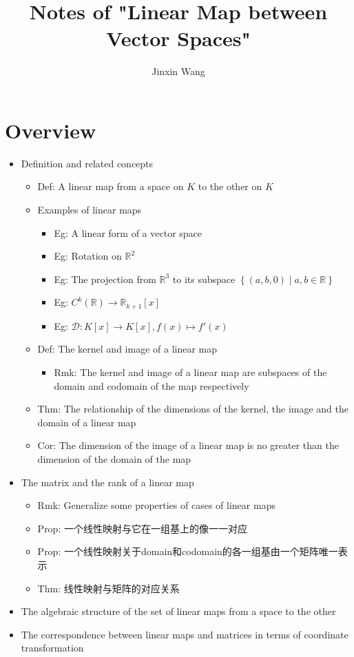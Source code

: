 \documentclass[onecolumn]{ctexart}
\title{Notes of "Linear Map between Vector Spaces"}
\author{Jinxin Wang}
\date{}
\begin{document}
\maketitle

\section{Overview}
\begin{itemize}
  \item Definition and related concepts
  \begin{itemize}
    \item Def: A linear map from a space on $K$ to the other on $K$
    \item Examples of linear maps
    \begin{itemize}
      \item Eg: A linear form of a vector space
      \item Eg: Rotation on $\mathbb{R}^2$
      \item Eg: The projection from $\mathbb{R}^3$ to its subspace $\left\{ (a, b, 0) \mid a, b \in \mathbb{R} \right\}$
      \item Eg: $C^k(\mathbb{R}) \to \mathbb{R}_{k+1}\left[ x \right]$
      \item Eg: $\mathcal{D}: K\left[ x \right] \to K\left[ x \right], f(x) \mapsto f'(x)$
    \end{itemize}
    \item Def: The kernel and image of a linear map
    \begin{itemize}
      \item Rmk: The kernel and image of a linear map are subspaces of the domain and codomain of the map respectively
    \end{itemize}
    \item Thm: The relationship of the dimensions of the kernel, the image and the domain of a linear map
    \item Cor: The dimension of the image of a linear map is no greater than the dimension of the domain of the map
  \end{itemize}
  \item The matrix and the rank of a linear map
  \begin{itemize}
    \item Rmk: Generalize some properties of cases of linear maps
    \item Prop: 一个线性映射与它在一组基上的像一一对应
    \item Prop: 一个线性映射关于domain和codomain的各一组基由一个矩阵唯一表示
    \item Thm: 线性映射与矩阵的对应关系
  \end{itemize}
  \item The algebraic structure of the set of linear maps from a space to the other
  \item The correspondence between linear maps and matrices in terms of coordinate transformation
\end{itemize}
\end{document}
